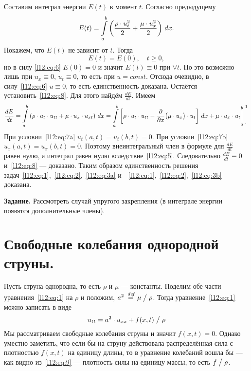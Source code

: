 \documentclass[12pt,a4paper,openany,fleqn]{book}
\newcommand {\defeq}{\stackrel{\hspace{0.09 cm}de\!f}{=}}
\newcommand {\eqdef}{\defeq}
\newcommand{\der}[2]{\ensuremath{\frac{d#1}{d#2}}}
\newcommand{\pder}[2]{\ensuremath{\frac{\partial#1}{\partial#2}}}
\theoremstyle{definition}
\begin{document}
Составим интеграл энергии $E(t)$ в момент $t$. Согласно предыдущему 
\begin{equation*}
	\hfill E(t)=\int\limits_a^b\left(\frac{\rho\cdot u^2_t}{2}+\frac{\mu\cdot u^2_x}{2}\right)\,dx.\hfill
\end{equation*} 
Покажем, что $E(t)$ не зависит от $t$. Тогда 
\begin{equation}
	\label{l12:eq:8}
	E(t)=E(0),\quad t\geqslant0,
\end{equation}
но в силу \eqref{l12:eq:6} $E(0)=0$ и значит $E(t)\equiv0$ при $\forall t$. Но это возможно лишь при $u_x\equiv0$, $u_t\equiv0$, то есть при $u=const$. Отсюда очевидно, в силу~\eqref{l12:eq:6} $u\equiv0$, то есть единственность доказана. Остаётся установить~\eqref{l12:eq:8}. Для этого найдём $\der{E}{t}$. Имеем 
\begin{equation*}
	\der{E}{t}=\int\limits_a^b\left(\rho\cdot u_t\cdot u_{tt}+\mu\cdot u_x\cdot u_{xt}\right)\,dx=\int\limits_a^b\left[\rho\cdot u_t\cdot u_{tt}-\pder{}{x}\big(\mu\cdot u_x\big)\cdot u_t\right]\,dx+\mu\cdot u_x\cdot u_t{\mathop{\Big|}\limits_a^b}\phantom{|}{\vphantom{\bigg|}}^{\footnotemark{}}_{\displaystyle.}
\end{equation*}
При условии~\eqref{l12:eq:7a} $u_t(a,t)=u_t(b,t)=0$. При условии~\eqref{l12:eq:7b} $u_x(a,t)=u_x(b,t)=0$. Поэтому внеинтегральный член в формуле для $\der{E}{t}$ равен нулю, а интеграл равен нулю вследствие~\eqref{l12:eq:5}. Следовательно $\der{E}{t}\equiv0$ и~\eqref{l12:eq:8} --- доказано. Таким образом единственность решения задач~\eqref{l12:eq:1},~\eqref{l12:eq:2},~\eqref{l12:eq:3a} и~~\eqref{l12:eq:1},~\eqref{l12:eq:2},~\eqref{l12:eq:3b} доказана.
\vspace{0.2cm}

\noindent\textbf{Задание. }Рассмотреть случай упругого закрепления (в интеграле энергии появятся дополнительные члены).

\section{Свободные колебания однородной струны.}
\label{lecture11section2}
Пусть струна однородна, то есть $\rho$ и $\mu$ --- константы. Поделим обе части уравнения~\eqref{l12:eq:1} на $\rho$ и положим, $a^2\eqdef{\mu}\bigm/{\rho}$. Тогда уравнение~\eqref{l12:eq:1} можно записать в виде
\begin{equation}
	\label{l12:eq:9}
	\hfill u_{tt}=a^2\cdot u_{xx}+f(x,t)\bigm/\rho\hfill
\end{equation}
Мы рассматриваем свободные колебания струны и значит $f(x,t)=0$. Однако уместно заметить, что если бы на струну действовала распределённая сила с плотностью $f(x,t)$ на единицу длины, то в уравнение колебаний вошла бы --- как видно из~\eqref{l12:eq:9} --- плотность силы на единицу массы, то есть $f\bigm/\rho$.
\end{document}
